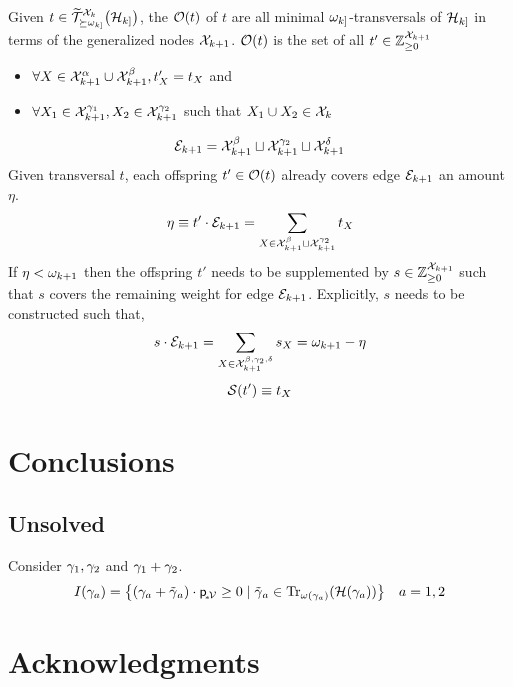 \documentclass[aps, 10pt, english, twoside, twocolumn, pra, nofootinbib, tightenlines, longbibliography, superscriptaddress]{revtex4-1}
\begin{document}
    \begin{definition}
        Given $t \in \widetilde {\s T}_{\succeq \w_{k]}}^{\s X_{k}}\br{\s H_{k]}}$, the  $\s O\br{t}$ of $t$ are all minimal $\omega_{k]}$-transversals of $\mathcal{H}_{k]}$ in terms of the generalized nodes $\mathcal{X}_{k+1}$. $\s O\br{t}$ is the set of all $t' \in {\mathbb{Z}}_{\geq 0}^{\mathcal{X}_{k+1}}$
        \begin{itemize}
            \item $\forall X \in \mathcal{X}_{k+1}^{\alpha} \cup \mathcal{X}_{k+1}^{\beta}, t'_{X} = t_{X}$ and
            \item $\forall X_1 \in \mathcal{X}_{k+1}^{\gamma_1}, X_2 \in \mathcal{X}_{k+1}^{\gamma_2}$ such that $X_1 \cup X_2 \in \mathcal{X}_{k}$
        \end{itemize}
    \end{definition}
    \[ \mathcal{E}_{k+1} = \mathcal{X}_{k+1}^{\beta} \sqcup \mathcal{X}_{k+1}^{\gamma_2} \sqcup \mathcal{X}_{k+1}^{\delta} \]
    Given transversal $t$, each offspring $t' \in \s O\br{t}$ already covers edge $\mathcal{E}_{k+1}$ an amount $\eta$.
    \[ \eta \equiv t' \cdot \mathcal{E}_{k+1} = \sum_{X \in \mathcal{X}_{k+1}^{\beta} \sqcup \mathcal{X}_{k+1}^{\gamma_2}} t_X \]
    If $\eta < \omega_{k+1}$ then the offspring $t'$ needs to be supplemented by $s \in {\mathbb{Z}}_{\geq 0}^{\mathcal{X}_{k+1}}$ such that $s$ covers the remaining weight for edge $\mathcal{E}_{k+1}$. Explicitly, $s$ needs to be constructed such that,
    \[ s \cdot \mathcal{E}_{k+1} = \sum_{X \in \mathcal{X}_{k+1}^{\beta, \gamma_2, \delta}} s_{X} = \omega_{k+1} - \eta  \]
    \[ \s S\br{t'} \defined  t_X \]


    \section{Conclusions}

    \subsection{Unsolved}
    Consider $\gamma_{1}, \gamma_{2}$ and $\gamma_{1} + \gamma_{2}$.
    \[ I\br{\ga_a} = \bc{\br{\ga_{a} + \ti \ga_{a}} \cdot \prob{\mscenariowrap} \geq 0 \mid \ti \ga_{a} \in \transversals{\w\br{\ga_a}}{\s H\br{\ga_a}}} \quad a = 1,2 \]

    \section*{Acknowledgments}

    \setlength{\bibsep}{3pt plus 3pt minus 2pt}
    
    \nocite{apsrev41Control}
    
\end{document}
